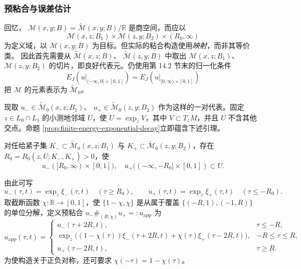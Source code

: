 \subsubsection*{预粘合与误差估计}
回忆，
$\mathcal M(x,y;B)=\widetilde{\mathcal M}(x,y;B)/\mathbb R$ 是商空间，而\termGluingMap{}应以
\[
 \mathcal M(x,z;B_1)\times\mathcal M(z,y;B_2)\times(R_0,\infty)
\]
为定义域，以 $\mathcal M(x,y;B)$ 为目标。但实际的粘合构造使用\emph{映射}，而非其等价类。
因此首先需要从 $\widetilde{\mathcal M}(x,z;B)$、
$\widetilde{\mathcal M}(z,y;B)$ 中取出 $\mathcal M(x,z;B_1)$、
$\mathcal M(z,y;B_2)$ 的切片，即良好代表元。仍使用第 14.2 节末的归一化条件
\begin{equation}
 E_J(u|_{(-\infty,0]\times[0,1]})
 =E_J(u|_{[0,\infty)\times[0,1]})
 \label{eq:gluing-energy-normalization}
\end{equation}
把 $\mathcal M$ 的元素表示为 $\widetilde{\mathcal M}_0$。

现取 $u_-\in\widetilde{\mathcal M}_0(x,z;B_1)$、
$u_+\in\widetilde{\mathcal M}_0(z,y;B_2)$ 作为这样的一对代表。固定
$z\in L_0\cap L_1$ 的小测地邻域 $U$，使 $U=\exp_zV$，其中
$V\subset T_zM$，并且 $U$ 不含其他交点。命题
\ref{prop:finite-energy-exponential-decay}立即蕴含下述引理。

\begin{lemma}
\label{lem:uniform-entry-geodesic-neighborhood}
对任给紧子集
$K_-\subset\widetilde{\mathcal M}_0(x,z;B_1)$ 与
$K_+\subset\widetilde{\mathcal M}_0(z,y;B_2)$，存在
$R_0=R_0(z,U;K_-,K_+)>0$，使
\begin{equation}
 u_-([R_0,\infty)\times[0,1]),\quad
 u_+(( -\infty,-R_0]\times[0,1])\subset U.
 \label{eq:gluing-ends-enter-neighborhood}
\end{equation}
\end{lemma}

由此可写
\[
 u_-(\tau,t)=\exp_z\xi_-(\tau,t)\quad(\tau\geq R_0),
 \qquad
 u_+(\tau,t)=\exp_z\xi_+(\tau,t)\quad(\tau\leq-R_0).
\]
取截断函数 $\chi:\mathbb R\to[0,1]$，使 $\{1-\chi,\chi\}$ 是从属于覆盖
$\{(-R,1),(-1,R)\}$ 的单位分解，定义预粘合
$u_-\#_{(R;\chi)}u_+=:u_{\mathrm{app}}$ 为
\[
 u_{\mathrm{app}}(\tau,t)=
 \begin{cases}
 u_-(\tau+2R,t),&\tau\leq-R,\\
 \exp_z\bigl((1-\chi(\tau))\xi_-(\tau+2R,t)
 +\chi(\tau)\xi_+(\tau-2R,t)\bigr),&-R\leq\tau\leq R,\\
 u_+(\tau-2R,t),&\tau\geq R.
 \end{cases}
\]
为使构造关于正负对称，还可要求 $\chi(-\tau)=1-\chi(\tau)$。

